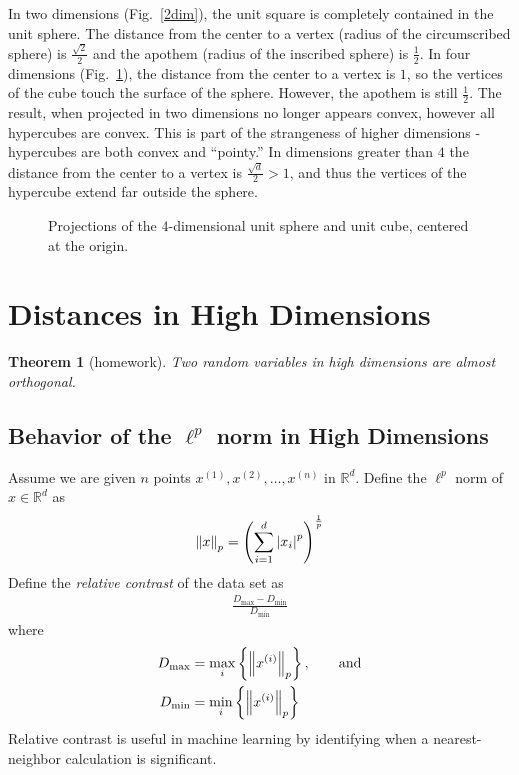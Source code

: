 \documentclass[12pt]{article}
\newcommand{\R}{\mathbb{R}}
\newtheorem{theorem}{Theorem}
\begin{document}
In two dimensions (Fig.~\ref{2dim}), the unit square is completely contained in the unit sphere.  The distance from the center to a vertex (radius of the circumscribed sphere) is $\frac{\sqrt{2}}{2}$ and the apothem (radius of the inscribed sphere) is $\frac{1}{2}$.  In four dimensions (Fig.~\ref{4dim}), the distance from the center to a vertex is $1$, so the vertices of the cube touch the surface of the sphere.  However, the apothem is still $\frac{1}{2}$.  The result, when projected in two dimensions no longer appears convex, however all hypercubes are convex.  This is part of the strangeness of higher dimensions - hypercubes are both convex and ``pointy.''  In dimensions greater than $4$ the distance from the center to a vertex is $\frac{\sqrt{d}}{2} > 1$, and thus the vertices of the hypercube extend far outside the sphere.

\begin{figure}[ht!]
  \centering
  \caption{Projections of the $4$-dimensional unit sphere and unit cube, centered at the origin.}
  \label{4dim}
\end{figure}

\section{Distances in High Dimensions}

\begin{theorem}[homework]
  Two random variables in high dimensions are almost orthogonal.
\end{theorem}

\subsection{Behavior of the $\ell^p$ norm in High Dimensions}

Assume we are given $n$ points $x^{(1)}, x^{(2)}, \dots, x^{(n)}$ in $\R^d$.  Define the $\ell^p$ norm of $x \in \R^d$ as
\begin{align*}
  \norm{x}_p = \qty(\sum_{i=1}^d \abs{x_i}^p)^{\frac{1}{p}}
\end{align*}
Define the \emph{relative contrast} of the data set as
\begin{align*}
  \frac{D_{\text{max}} - D_{\text{min}}}{D_{\text{min}}}
\end{align*}
where
\begin{align*}
  D_{\text{max}} &= \max_i \left\{\norm{x^{(i)}}_p\right\}, \qquad \text{and} \\
  D_{\text{min}} &= \min_i \left\{\norm{x^{(i)}}_p\right\}
\end{align*}
Relative contrast is useful in machine learning by identifying when a nearest-neighbor calculation is significant.
\end{document}
